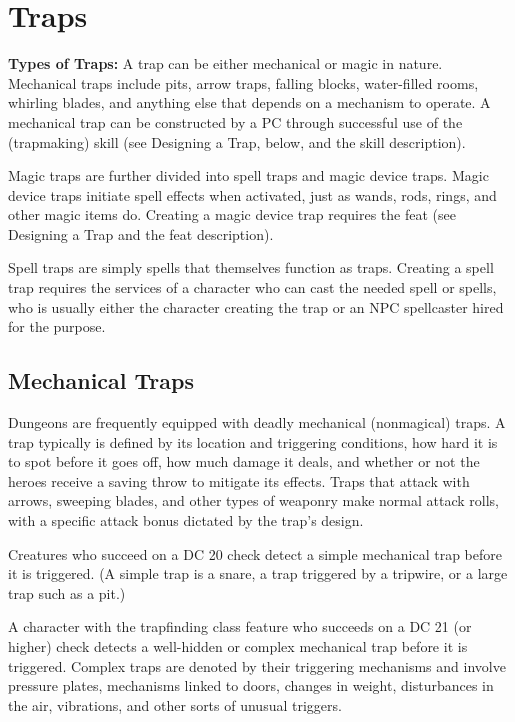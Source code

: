 \section{Traps}

\textbf{Types of Traps:} A trap can be either mechanical or magic in nature. Mechanical traps include pits, arrow traps, falling blocks, water-filled rooms, whirling blades, and anything else that depends on a mechanism to operate. A mechanical trap can be constructed by a PC through successful use of the  (trapmaking) skill (see Designing a Trap, below, and the skill description).

Magic traps are further divided into spell traps and magic device traps. Magic device traps initiate spell effects when activated, just as wands, rods, rings, and other magic items do. Creating a magic device trap requires the  feat (see Designing a Trap and the feat description).

Spell traps are simply spells that themselves function as traps. Creating a spell trap requires the services of a character who can cast the needed spell or spells, who is usually either the character creating the trap or an NPC spellcaster hired for the purpose.

\subsection{Mechanical Traps}
Dungeons are frequently equipped with deadly mechanical (nonmagical) traps. A trap typically is defined by its location and triggering conditions, how hard it is to spot before it goes off, how much damage it deals, and whether or not the heroes receive a saving throw to mitigate its effects. Traps that attack with arrows, sweeping blades, and other types of weaponry make normal attack rolls, with a specific attack bonus dictated by the trap's design.

Creatures who succeed on a DC 20  check detect a simple mechanical trap before it is triggered. (A simple trap is a snare, a trap triggered by a tripwire, or a large trap such as a pit.)

A character with the trapfinding class feature who succeeds on a DC 21 (or higher)  check detects a well-hidden or complex mechanical trap before it is triggered. Complex traps are denoted by their triggering mechanisms and involve pressure plates, mechanisms linked to doors, changes in weight, disturbances in the air, vibrations, and other sorts of unusual triggers.

